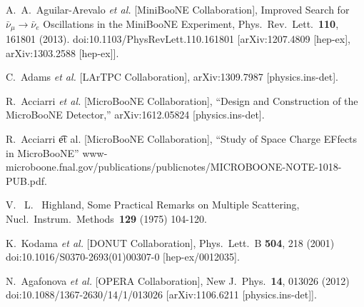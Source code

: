\documentclass[a4paper,11pt]{article}
\begin{document}
\clearpage
\begin{thebibliography}{99}




  A.~A.~Aguilar-Arevalo {\it et al.} 
  [MiniBooNE Collaboration],
  Improved Search for $\bar \nu_\mu \rightarrow \bar \nu_e$ Oscillations in the MiniBooNE Experiment,
  Phys.\ Rev.\ Lett.\  {\bf 110}, 161801 (2013).
  doi:10.1103/PhysRevLett.110.161801
  [arXiv:1207.4809 [hep-ex], arXiv:1303.2588 [hep-ex]].

  C.~Adams {\it et al.} [LArTPC Collaboration],
  arXiv:1309.7987 [physics.ins-det].


  R.~Acciarri {\it et al.} [MicroBooNE Collaboration],
  ``Design and Construction of the MicroBooNE Detector,''
  arXiv:1612.05824 [physics.ins-det].

  R.~Acciarri {\t et al.} [MicroBooNE Collaboration],
  ``Study of Space Charge EFfects in MicroBooNE''
  www-microboone.fnal.gov/publications/publicnotes/MICROBOONE-NOTE-1018-PUB.pdf.


  V. ~L. ~Highland, 
  Some Practical Remarks on Multiple Scattering, 
  Nucl.\ Instrum.\ Methods\ {\bf 129} (1975)
  104-120.
 

  K.~Kodama {\it et al.} [DONUT Collaboration],
  Phys.\ Lett.\ B {\bf 504}, 218 (2001)
  doi:10.1016/S0370-2693(01)00307-0
  [hep-ex/0012035].

  N.~Agafonova {\it et al.} [OPERA Collaboration],
  New J.\ Phys.\  {\bf 14}, 013026 (2012)
  doi:10.1088/1367-2630/14/1/013026
  [arXiv:1106.6211 [physics.ins-det]].


\end{thebibliography}
\end{document}
